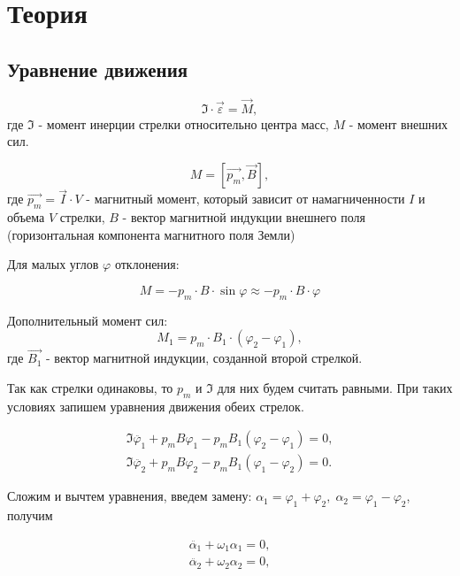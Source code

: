 \documentclass{letask}
\begin{document}
\section{Теория}

\subsection{Уравнение движения}  

\begin{equation}
\mathfrak{I} \cdot \vec{\varepsilon} = \vec{M},
\end{equation}
где $\mathfrak{I}$ - момент инерции стрелки относительно центра масс, $M$ - момент внешних сил.

\begin{equation}
M = \left[ \vec{p_m}, \vec{B} \right],
\end{equation}
где $\vec{p_m} = \vec{I} \cdot V$ - магнитный момент, который зависит от намагниченности $I$ и объема $V$ стрелки, $B$ - вектор магнитной индукции внешнего поля (горизонтальная компонента магнитного поля Земли)

Для малых углов $\varphi$ отклонения:

\begin{equation}
M = - p_m \cdot B \cdot \sin \varphi \approx - p_m \cdot B \cdot \varphi
\end{equation}

Дополнительный момент сил:
\begin{equation}
M_1 = p_m \cdot B_1 \cdot (\varphi_2 - \varphi_1),
\end{equation}
где $\vec{B_1}$ - вектор магнитной индукции, созданной второй стрелкой.

Так как стрелки одинаковы, то $p_m$ и $\mathfrak{I}$ для них будем считать равными. При таких условиях запишем уравнения движения обеих стрелок.

\begin{equation}
\begin{gathered}
\mathfrak{I} \ddot{\varphi_1} + p_m B \varphi_1 - p_m B_1 (\varphi_2 - \varphi_1) = 0, \\
\mathfrak{I} \ddot{\varphi_2} + p_m B \varphi_2 - p_m B_1 (\varphi_1 - \varphi_2) = 0.
\end{gathered}
\end{equation}


Сложим и вычтем уравнения, введем замену: $\alpha_1 = \varphi_1 + \varphi_2, \; \alpha_2 = \varphi_1 - \varphi_2$, получим

\begin{equation}
\begin{gathered}
\ddot{\alpha_1} + \omega_1 \alpha_1 = 0, \\
\ddot{\alpha_2} + \omega_2 \alpha_2 = 0,
\end{gathered}
\end{equation}
\end{document}
